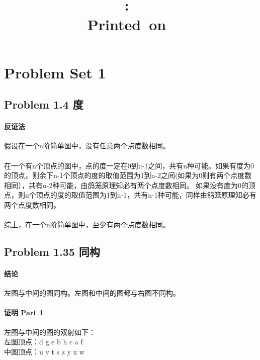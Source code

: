 \documentclass[17pt,UTF-8,a4paper]{ctexart}
\title{
    \vspace{2in}
    \textmd{\textbf{\hmwkClass:\ \hmwkTitle}}\\
    \normalsize\vspace{0.1in}\small{Printed\ on\ \hmwkDueDate}\\
    \vspace{0.1in}\large{\textit{\hmwkClassInstructor}}
    \vspace{3in}
}
\author{\hmwkAuthorName}
\date{}
\begin{document}


\section*{Problem Set 1}

\subsection*{Problem 1.4 度}
\paragraph*{反证法}
假设在一个n阶简单图中，没有任意两个点度数相同。

\paragraph*{}
在一个有n个顶点的图中，点的度一定在0到n-1之间，共有n种可能。如果有度为0的顶点，则余下n-1个顶点的度的取值范围为1到n-2之间(如果为0则有两个点度数相同），共有n-2种可能，由鸽笼原理知必有两个点度数相同。
如果没有度为0的顶点，则n个顶点的度的取值范围为1到n-1，共有n-1种可能，同样由鸽笼原理知必有两个点度数相同。

\paragraph*{}
综上，在一个n阶简单图中，至少有两个点度数相同。


\subsection*{Problem 1.35 同构}




\paragraph*{结论}
左图与中间的图同构。左图和中间的图都与右图不同构。

\paragraph*{证明 Part 1}
左图与中间的图的双射如下：\\
左图顶点：d g e b h c a f\\
中图顶点：u v t s z y x w 
\end{document}
